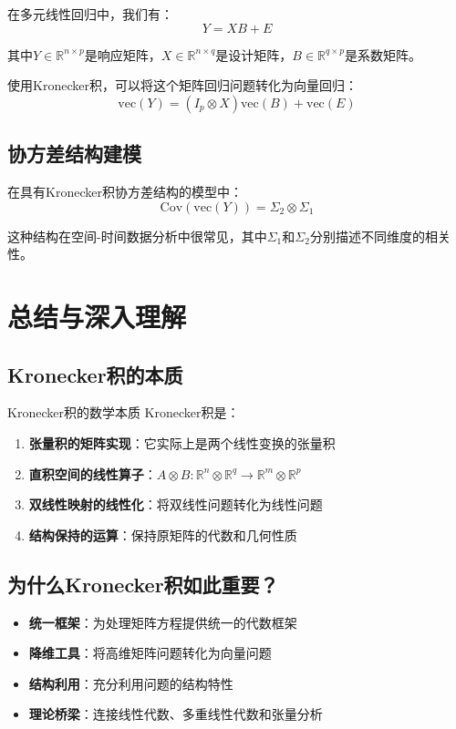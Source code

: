\documentclass[11pt,a4paper]{ctexart}
\theoremstyle{definition}
\newcommand{\RR}{\mathbb{R}}
\newcommand{\vect}{\text{vec}}
\begin{document}
在多元线性回归中，我们有：
$$Y = XB + E$$

其中$Y \in \RR^{n \times p}$是响应矩阵，$X \in \RR^{n \times q}$是设计矩阵，$B \in \RR^{q \times p}$是系数矩阵。

使用Kronecker积，可以将这个矩阵回归问题转化为向量回归：
$$\vect(Y) = (I_p \otimes X) \vect(B) + \vect(E)$$

\subsection{协方差结构建模}

在具有Kronecker积协方差结构的模型中：
$$\text{Cov}(\vect(Y)) = \Sigma_2 \otimes \Sigma_1$$

这种结构在空间-时间数据分析中很常见，其中$\Sigma_1$和$\Sigma_2$分别描述不同维度的相关性。

\section{总结与深入理解}

\subsection{Kronecker积的本质}

\begin{insight}{Kronecker积的数学本质}
Kronecker积是：
\begin{enumerate}
\item \textbf{张量积的矩阵实现}：它实际上是两个线性变换的张量积
\item \textbf{直积空间的线性算子}：$A \otimes B: \RR^n \otimes \RR^q \to \RR^m \otimes \RR^p$
\item \textbf{双线性映射的线性化}：将双线性问题转化为线性问题
\item \textbf{结构保持的运算}：保持原矩阵的代数和几何性质
\end{enumerate}
\end{insight}

\subsection{为什么Kronecker积如此重要？}

\begin{itemize}
\item \textbf{统一框架}：为处理矩阵方程提供统一的代数框架
\item \textbf{降维工具}：将高维矩阵问题转化为向量问题
\item \textbf{结构利用}：充分利用问题的结构特性
\item \textbf{理论桥梁}：连接线性代数、多重线性代数和张量分析
\end{itemize}
\end{document}
